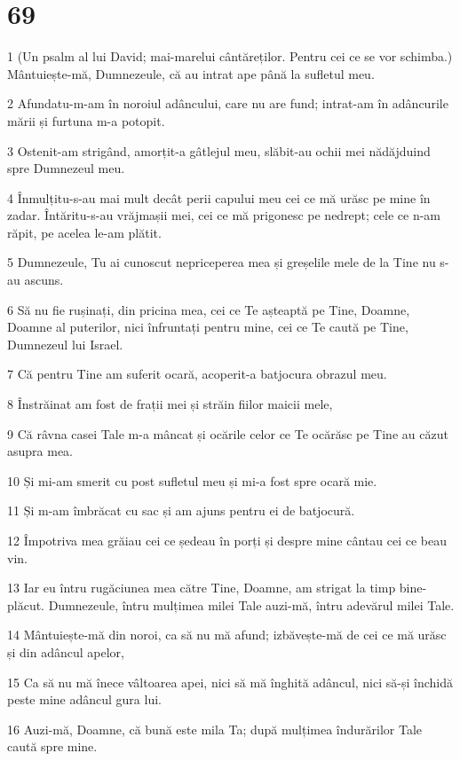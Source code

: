 \chapter{69}

\par 1 (Un psalm al lui David; mai-marelui cântăreților. Pentru cei ce se vor schimba.) Mântuiește-mă, Dumnezeule, că au intrat ape până la sufletul meu.
\par 2 Afundatu-m-am în noroiul adâncului, care nu are fund; intrat-am în adâncurile mării și furtuna m-a potopit.
\par 3 Ostenit-am strigând, amorțit-a gâtlejul meu, slăbit-au ochii mei nădăjduind spre Dumnezeul meu.
\par 4 Înmulțitu-s-au mai mult decât perii capului meu cei ce mă urăsc pe mine în zadar. Întăritu-s-au vrăjmașii mei, cei ce mă prigonesc pe nedrept; cele ce n-am răpit, pe acelea le-am plătit.
\par 5 Dumnezeule, Tu ai cunoscut nepriceperea mea și greșelile mele de la Tine nu s-au ascuns.
\par 6 Să nu fie rușinați, din pricina mea, cei ce Te așteaptă pe Tine, Doamne, Doamne al puterilor, nici înfruntați pentru mine, cei ce Te caută pe Tine, Dumnezeul lui Israel.
\par 7 Că pentru Tine am suferit ocară, acoperit-a batjocura obrazul meu.
\par 8 Înstrăinat am fost de frații mei și străin fiilor maicii mele,
\par 9 Că râvna casei Tale m-a mâncat și ocările celor ce Te ocărăsc pe Tine au căzut asupra mea.
\par 10 Și mi-am smerit cu post sufletul meu și mi-a fost spre ocară mie.
\par 11 Și m-am îmbrăcat cu sac și am ajuns pentru ei de batjocură.
\par 12 Împotriva mea grăiau cei ce ședeau în porți și despre mine cântau cei ce beau vin.
\par 13 Iar eu întru rugăciunea mea către Tine, Doamne, am strigat la timp bine-plăcut. Dumnezeule, întru mulțimea milei Tale auzi-mă, întru adevărul milei Tale.
\par 14 Mântuiește-mă din noroi, ca să nu mă afund; izbăvește-mă de cei ce mă urăsc și din adâncul apelor,
\par 15 Ca să nu mă înece vâltoarea apei, nici să mă înghită adâncul, nici să-și închidă peste mine adâncul gura lui.
\par 16 Auzi-mă, Doamne, că bună este mila Ta; după mulțimea îndurărilor Tale caută spre mine.
